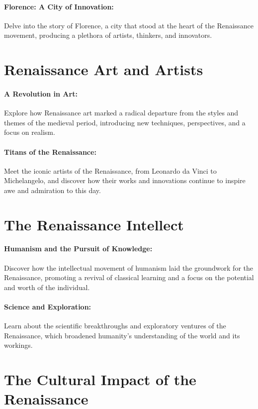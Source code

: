 \documentclass[a4paper,12pt]{book}
\begin{document}
\paragraph{Florence: A City of Innovation:}
Delve into the story of Florence, a city that stood at the heart of the Renaissance movement, producing a plethora of artists, thinkers, and innovators.

\section*{Renaissance Art and Artists}

\paragraph{A Revolution in Art:}
Explore how Renaissance art marked a radical departure from the styles and themes of the medieval period, introducing new techniques, perspectives, and a focus on realism.

\paragraph{Titans of the Renaissance:}
Meet the iconic artists of the Renaissance, from Leonardo da Vinci to Michelangelo, and discover how their works and innovations continue to inspire awe and admiration to this day.

\section*{The Renaissance Intellect}

\paragraph{Humanism and the Pursuit of Knowledge:}
Discover how the intellectual movement of humanism laid the groundwork for the Renaissance, promoting a revival of classical learning and a focus on the potential and worth of the individual.

\paragraph{Science and Exploration:}
Learn about the scientific breakthroughs and exploratory ventures of the Renaissance, which broadened humanity’s understanding of the world and its workings.

\section*{The Cultural Impact of the Renaissance}
\end{document}

